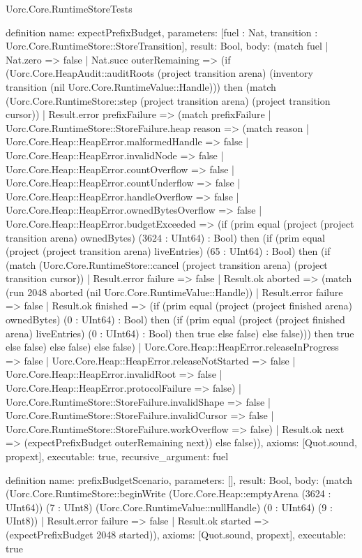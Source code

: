 \begin{lexlean}{Uorc.Core.RuntimeStoreTests}
\begin{semanticmodule}
definition{
  name: expectPrefixBudget,
  parameters: [fuel : Nat, transition : Uorc.Core.RuntimeStore::StoreTransition],
  result: Bool,
  body: (match fuel
    | Nat.zero => false
    | Nat.succ outerRemaining => (if (Uorc.Core.HeapAudit::auditRoots (project transition arena) (inventory transition (nil Uorc.Core.RuntimeValue::Handle))) then (match (Uorc.Core.RuntimeStore::step (project transition arena) (project transition cursor))
      | Result.error prefixFailure => (match prefixFailure
        | Uorc.Core.RuntimeStore::StoreFailure.heap reason => (match reason
          | Uorc.Core.Heap::HeapError.malformedHandle => false
          | Uorc.Core.Heap::HeapError.invalidNode => false
          | Uorc.Core.Heap::HeapError.countOverflow => false
          | Uorc.Core.Heap::HeapError.countUnderflow => false
          | Uorc.Core.Heap::HeapError.handleOverflow => false
          | Uorc.Core.Heap::HeapError.ownedBytesOverflow => false
          | Uorc.Core.Heap::HeapError.budgetExceeded => (if (prim equal (project (project transition arena) ownedBytes) (3624 : UInt64) : Bool) then (if (prim equal (project (project transition arena) liveEntries) (65 : UInt64) : Bool) then (if (match (Uorc.Core.RuntimeStore::cancel (project transition arena) (project transition cursor))
            | Result.error failure => false
            | Result.ok aborted => (match (run 2048 aborted (nil Uorc.Core.RuntimeValue::Handle))
              | Result.error failure => false
              | Result.ok finished => (if (prim equal (project (project finished arena) ownedBytes) (0 : UInt64) : Bool) then (if (prim equal (project (project finished arena) liveEntries) (0 : UInt64) : Bool) then true else false) else false))) then true else false) else false) else false)
          | Uorc.Core.Heap::HeapError.releaseInProgress => false
          | Uorc.Core.Heap::HeapError.releaseNotStarted => false
          | Uorc.Core.Heap::HeapError.invalidRoot => false
          | Uorc.Core.Heap::HeapError.protocolFailure => false)
        | Uorc.Core.RuntimeStore::StoreFailure.invalidShape => false
        | Uorc.Core.RuntimeStore::StoreFailure.invalidCursor => false
        | Uorc.Core.RuntimeStore::StoreFailure.workOverflow => false)
      | Result.ok next => (expectPrefixBudget outerRemaining next)) else false)),
  axioms: [Quot.sound, propext],
  executable: true,
  recursive_argument: fuel
}

definition{
  name: prefixBudgetScenario,
  parameters: [],
  result: Bool,
  body: (match (Uorc.Core.RuntimeStore::beginWrite (Uorc.Core.Heap::emptyArena (3624 : UInt64)) (7 : UInt8) (Uorc.Core.RuntimeValue::nullHandle) (0 : UInt64) (9 : UInt8))
    | Result.error failure => false
    | Result.ok started => (expectPrefixBudget 2048 started)),
  axioms: [Quot.sound, propext],
  executable: true
}


\end{semanticmodule}
\end{lexlean}
